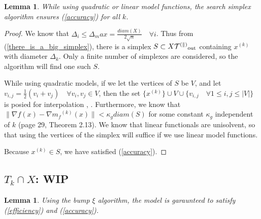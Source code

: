 \documentclass{article}
\newtheorem{lemma}[theorem]{Lemma}
\theoremstyle{case}
\newcommand{\domain}{X}
\newcommand{\modelk}{{{m}_f}^{(k)}}
\newcommand{\iteratek}{{x}^{(k)}}
\newcommand{\outertrk}{{T^{(k)}}_{\text{out}}}
\let\oldref\ref
\renewcommand{\ref}[1]{(\oldref{#1})}
\begin{document}
\begin{lemma}
While using quadratic or linear model functions, the search simplex algorithm ensures \ref{accuracy} for all $k$.
\end{lemma}
\begin{proof}


We know that $\Delta_i \le \Delta_max = \frac {diam(\domain)}{2\sqrt{n}} \quad \forall i$.
Thus from \ref{there_is_a_big_simplex}, there is a simplex $S \subset \domain \cal \outertrk $ containing $\iteratek$ with diameter $\Delta_k$.
Only a finite number of simplexes are considered, so the algorithm will find one such $S$.

While using quadratic models, if we let the vertices of $S$ be $V$, and let $v_{i,j} = \frac 1 2 (v_i + v_j) \quad \forall v_i, v_j \in V$, then the set
$\{\iteratek\} \cup V \cup \{v_{i,j} \quad \forall 1\le i, j \le |V|\}$ is posied for interpolation \cite{Ciarlet1971}, \cite{Ciarlet1972}.
Furthermore, we know that $\|\nabla f(x) - \nabla \modelk(x)\| < \kappa_{g} diam(S)$ for some constant $\kappa_{g}$ independent of $k$ \cite{DUMMY:intro_book} (page 29, Theorem 2.13).
We know that linear functionals are unisolvent, so that using the vertices of the simplex will suffice if we use linear model functions.

Because $x^{(k)} \in S$, we have satisfied \ref{accuracy}.

\end{proof}







\subsection{$T_k \cap \domain$: WIP}
\begin{lemma}
Using the bump $\xi$ algorithm, the model is garaunteed to satisfy \ref{efficiency} and \ref{accuracy}.
\end{lemma}
\end{document}
